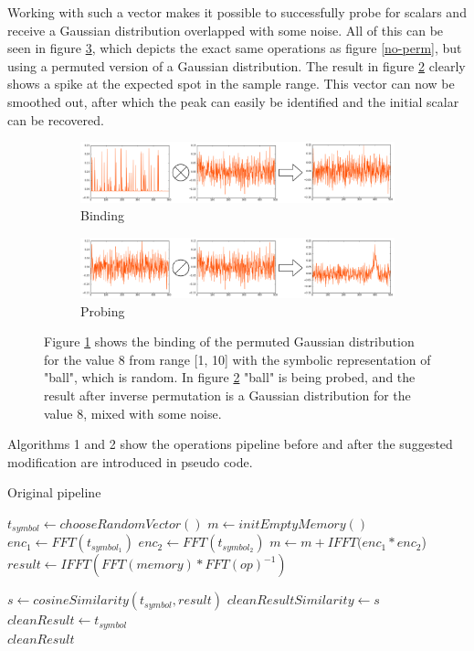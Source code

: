 \documentclass[journal]{journal}
\begin{document}
	Working with such a vector makes it possible to successfully probe for scalars and receive a Gaussian distribution overlapped with some noise.
All of this can be seen in figure \ref{perm}, which depicts the exact same operations as figure \ref{no-perm}, but using a permuted version of a Gaussian distribution.
The result in figure \ref{perm-b} clearly shows a spike at the expected spot in the sample range.
This vector can now be smoothed out, after which the peak can easily be identified and the initial scalar can be recovered.
	
	\begin{figure}
		\begin{subfigure}{1\columnwidth}
			\includegraphics[width=\columnwidth]{img/scalar-post-perm.png}
			\caption{Binding}
			\label{perm-a}
		\end{subfigure}
		\begin{subfigure}{1\columnwidth}
			\includegraphics[width=\columnwidth]{img/scalar-post-perm-probe.png}
			\caption{Probing}
			\label{perm-b}
		\end{subfigure}
		\caption{Figure \ref{perm-a} shows the binding of the permuted Gaussian distribution for the value 8 from range [1, 10] with the symbolic representation of "ball", which is random.
In figure \ref{perm-b} "ball" is being probed, and the result after inverse permutation is a Gaussian distribution for the value 8, mixed with some noise.}
		\label{perm}
	\end{figure}
	
	Algorithms 1 and 2 show the operations pipeline before and after the suggested modification are introduced in pseudo code.
	
	\begin{algorithm}
		\caption{Original pipeline}
		\begin{algorithmic}[1]
			\State $t_{symbol} \gets chooseRandomVector()$
			\EndFor
			\State $m \gets initEmptyMemory()$
			\State $enc_1 \gets FFT(t_{symbol_1})$
			\State $enc_2 \gets FFT(t_{symbol_2})$
			\State $m \gets m + IFFT(enc_1 * enc_2$)
			\EndFor		
			\State $result\gets IFFT(FFT(memory)* FFT(op)^{-1})$
			
			\State $s \gets cosineSimilarity(t_{symbol}, result)$
			\State $cleanResultSimilarity \gets s$
			\State $cleanResult \gets t_{symbol}$
			\EndIf
			\EndFor \\
			\Return $cleanResult$
			\EndFunction
		\end{algorithmic}
	\end{algorithm}
	
\end{document}
